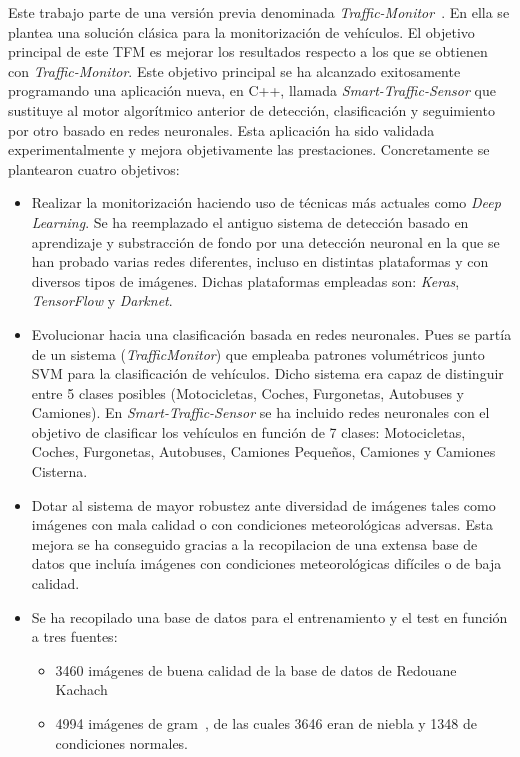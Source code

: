 Este trabajo parte de una versión previa denominada \textit{Traffic-Monitor}~\cite{traffic_monitor_redo}. En ella se plantea una solución clásica para la monitorización de vehículos. El objetivo principal de este TFM es mejorar los resultados respecto a los que se obtienen con \textit{Traffic-Monitor}. Este objetivo principal se ha alcanzado exitosamente programando una
aplicación nueva, en C++, llamada \textit{Smart-Traffic-Sensor} que sustituye al motor algorítmico anterior de detección, clasificación y seguimiento por otro basado en redes neuronales. Esta aplicación ha sido validada experimentalmente y mejora objetivamente las prestaciones. Concretamente se plantearon cuatro  objetivos:
\begin{itemize}
    \item Realizar la monitorización haciendo uso de técnicas más actuales como \textit{Deep Learning}. Se ha reemplazado el antiguo sistema de detección basado en aprendizaje y substracción de fondo por una detección neuronal en la que se han probado varias redes diferentes, incluso en distintas plataformas y con diversos tipos de imágenes. Dichas plataformas empleadas son: \textit{Keras}, \textit{TensorFlow} y \textit{Darknet}.
    \item Evolucionar hacia una clasificación basada en redes neuronales. Pues se partía de un sistema (\textit{TrafficMonitor}) que empleaba patrones volumétricos junto SVM para la clasificación de vehículos. Dicho sistema era capaz de distinguir entre 5 clases posibles (Motocicletas, Coches, Furgonetas, Autobuses y Camiones). En \textit{Smart-Traffic-Sensor} se ha incluido redes neuronales con el objetivo de clasificar los vehículos en función de 7 clases: Motocicletas, Coches, Furgonetas, Autobuses, Camiones Pequeños, Camiones y Camiones Cisterna.
    \item Dotar al sistema de mayor robustez ante diversidad de imágenes tales como imágenes con mala calidad o con condiciones meteorológicas adversas. Esta mejora se ha conseguido gracias a la recopilacion de una extensa base de datos que incluía imágenes con condiciones meteorológicas difíciles o de baja calidad.
    \item Se ha recopilado una base de datos para el entrenamiento y el test en función a tres fuentes: 
    \begin{itemize}
        \item 3460 imágenes de buena calidad de la base de datos de Redouane Kachach~\cite{traffic_monitor_lab}
        \item 4994 imágenes de \acrfull{gram}~\cite{guerrero2013iwinac}, de las cuales 3646 eran de niebla y  1348 de condiciones normales.

\end{itemize}
\end{itemize}
